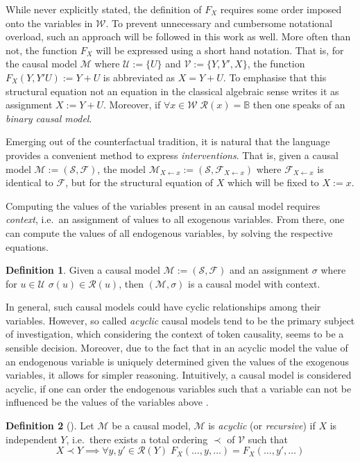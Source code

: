 \documentclass[11pt,a4paper]{book}
\theoremstyle{definition}
\newtheorem{definition}{Definition}[section]
\theoremstyle{definition}
\theoremstyle{definition}
\theoremstyle{remark}
\newcommand{\cmodel}{\mathcal{M}}
\newcommand{\csig}{\mathcal{S}}
\newcommand{\cfoos}{\mathcal{F}}
\newcommand{\crange}{\mathcal{R}}
\newcommand{\cvars}{\mathcal{W}}
\newcommand{\cenvars}{\mathcal{V}}
\newcommand{\cexvars}{\mathcal{U}}
\begin{document}
While never explicitly stated, the definition of $F_X$ requires some order imposed onto the variables in $\cvars$. To prevent unnecessary and cumbersome notational overload, such an approach will be followed in this work as well.
More often than not, the function $F_X$ will be expressed using a short hand notation. That is, for the causal model $\cmodel$ where $\cexvars := \{U\}$ and $\cenvars := \{Y,Y',X\}$, the function $F_{X}(Y,Y'U):=Y+U$ is abbreviated
as $X = Y+U$. To emphasise that this structural equation not an equation in the classical algebraic sense \cite{Weslake2015partialtheory} writes it as assignment $X := Y+U$.
Moreover, if $\forall x \in \cvars\; \crange(x)=\mathbb{B}$ then one speaks of an \emph{binary causal model}.

Emerging out of the counterfactual tradition, it is natural that the language provides a convenient method to express \emph{interventions}. That is, given a causal model $\cmodel:=(\csig, \cfoos)$, the model $\cmodel_{X \leftarrow x}:=(\csig, \cfoos_{X \leftarrow x})$ where $\cfoos_{X \leftarrow x}$ is identical to $\cfoos$, but for the structural equation of $X$ which will be fixed to $X:=x$.


Computing the values of the variables present in an causal model requires \emph{context}, i.e.\ an assignment of values to all exogenous variables. From there, one can compute the values of all endogenous variables, by solving the respective equations.

\begin{definition}
Given a causal model $\cmodel:=(\csig, \cfoos)$ and an assignment $\sigma$ where for $u \in \cexvars$ $\sigma(u) \in \crange(u)$, then $(\cmodel, \sigma)$ is a causal model with context.
\end{definition}

In general, such causal models could have cyclic relationships among their variables. However, so called \emph{acyclic} causal models tend to be the primary subject of investigation, which considering the context of token causality, seems to be a sensible decision. Moreover, due to the fact that in an acyclic model the value of an endogenous variable is uniquely determined given the values of the exogenous variables, it allows for simpler reasoning. Intuitively, a causal model is considered acyclic, if one can order the endogenous variables such that a variable can not be influenced be the values of the variables above \cite{halpern2015cause}.  

\begin{definition}[\cite{halpern2015cause}]
Let $\cmodel$ be a causal model, $\cmodel$ is \emph{acyclic} (or \emph{recursive}) if $X$ is independent $Y$, i.e.\ there exists a total ordering $\prec$ of $\cenvars$ such that
\begin{equation*}
 X \prec Y \implies  \forall y,y' \in \crange(Y) \; F_X(\dots , y, \dots) = F_X(\dots , y', \dots) 
\end{equation*}
\end{definition}
\end{document}
